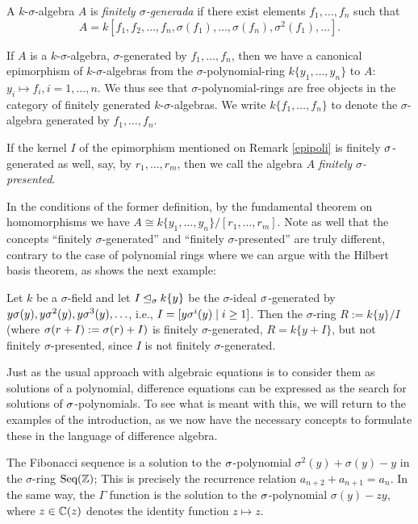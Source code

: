 \begin{defn}
A $k$-$\sigma$-algebra  $A$ is \emph{finitely $\sigma$-generada} if there exist elements $f_1, \ldots, f_n$ such that $$A = k[f_1,f_2,\ldots,f_n,\sigma(f_1),\ldots,\sigma(f_n),\sigma^2(f_1),\ldots].$$
\end{defn}

\begin{rem}\label{epipoli}
If $A$ is a $k$-$\sigma$-algebra, $\sigma$-generated by $f_1, \ldots, f_n$, then we have a canonical epimorphism of $k$-$\sigma$-algebras from the $\sigma$-polynomial-ring $k\{y_1, \ldots, y_n \}$ to $A$: $y_i \mapsto f_i, i = 1, \ldots, n$. We thus see that $\sigma$-polynomial-rings are free objects in the category of finitely generated $k$-$\sigma$-algebras. We write  $k\{f_1, \ldots, f_n\}$ to denote the  $\sigma$-algebra generated by $f_1, \ldots, f_n$.
\end{rem}

\begin{defn}
If the kernel $I$ of the epimorphism mentioned on Remark \ref{epipoli} is finitely $\sigma$-generated as well, say, by $r_1, \ldots, r_m$, then we call the algebra $A$ \emph{finitely $\sigma$-presented}. 
\end{defn}

\begin{rem}
In the conditions of the former definition, by the fundamental theorem on homomorphisms we have $A \cong k\{y_1, \ldots, y_n\}/[r_1,\ldots,r_m]$. Note as well that the concepts ``finitely $\sigma$-generated'' and ``finitely $\sigma$-presented'' are truly different, contrary to the case of polynomial rings where we can argue with the Hilbert basis theorem, as shows the next example:
\end{rem}

\begin{ex}
Let $k$ be a $\sigma$-field and let $I \unlhd_{\sigma} k\{y\} $ be the $\sigma$-ideal $\sigma$-generated by $y\sigma(y), y\sigma^2(y), y\sigma^3(y), \ldots$, i.e., $I = [y \sigma^i(y) \mid i\geq 1]$. Then the $\sigma$-ring $R := k\{y\}/I$ (where $\sigma (r + I) := \sigma(r) + I)$ is 
finitely $\sigma$-generated, $R = k\{ y + I \}$, but not finitely $\sigma$-presented, since $I$ is not finitely $\sigma$-generated.
\end{ex}


Just as the usual approach with algebraic equations is to consider them as solutions of a polynomial, difference equations can be expressed as the search for solutions of $\sigma$-polynomials. To see what is meant with this, we will return to the examples of the introduction,
 as we now have the necessary concepts to formulate these in the language of difference algebra. 

\begin{ex}
The Fibonacci sequence is a solution to the $\sigma$-polynomial $\sigma^2(y) + \sigma(y) - y$ in the $\sigma$-ring  $\text{Seq}(\mathbb{Z})$; This is precisely the recurrence relation $a_{n+2} + a_{n+1} = a_n$.
In the same way, the $\Gamma$ function is the solution to the $\sigma$-polynomial $\sigma(y) - zy$, where $z \in \mathbb{C}(z)$ denotes the identity function $z \mapsto z$.
\end{ex}
